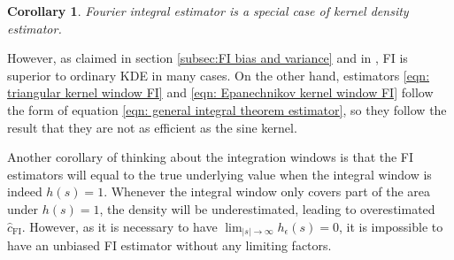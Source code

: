 \documentclass[%
 reprint,
 amsmath,amssymb,
 aps,
]{revtex4-2}
\newtheorem{corollary}[theorem]{Corollary}
\begin{document}
\begin{corollary}
Fourier integral estimator is a special case of kernel density estimator.    
\end{corollary}

However, as claimed in section \ref{subsec:FI bias and variance} and in \cite{rotiroti2022computing}, FI is superior to ordinary KDE in many cases. On the other hand, estimators \eqref{eqn: triangular kernel window FI} and \eqref{eqn: Epanechnikov kernel window FI} follow the form of equation \eqref{eqn: general integral theorem estimator}, so they follow the result \cite{ho2021integral} that they are not as efficient as the sine kernel.

Another corollary of thinking about the integration windows is that the FI estimators will equal to the true underlying value when the integral window is indeed $h(s) = 1$. Whenever the integral window only covers part of the area under $h(s) = 1$, the density will be underestimated, leading to overestimated $\hat{c}_\text{FI}$. However, as it is necessary to have $\displaystyle\lim_{|s| \to \infty} h_\epsilon(s) = 0$, it is impossible to have an unbiased FI estimator without any limiting factors.
\end{document}
